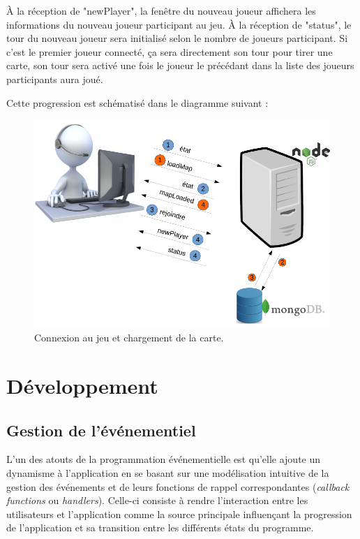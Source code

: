 \documentclass[12pt]{report}
\begin{document}
			À la réception de "newPlayer", la fenêtre du nouveau joueur affichera les informations du nouveau joueur participant au jeu. À la réception de "status", le tour du nouveau joueur sera initialisé selon le nombre de joueurs participant. Si c'est le premier joueur connecté, ça sera directement son tour pour tirer une carte, son tour sera activé une fois le joueur le précédant dans la liste des joueurs participants aura joué.

			Cette progression est schématisé dans le diagramme suivant :

			\begin{figure}[h!]
		  	\centering
		    \includegraphics[scale=0.5]{useCase1.png}
		    \caption{Connexion au jeu et chargement de la carte.}
		  \end{figure}

\chapter{Développement}

  \section{Gestion de l'événementiel}
	L'un des atouts de la programmation événementielle est qu'elle ajoute un dynamisme à l'application en se basant sur une modélisation intuitive de la gestion des événements et de leurs fonctions de rappel correspondantes (\textit{callback functions} ou \textit{handlers}). Celle-ci consiste à rendre l'interaction entre les utilisateurs et l'application comme la source principale influençant la progression de l'application et sa transition entre les différents états du programme.
\end{document}
